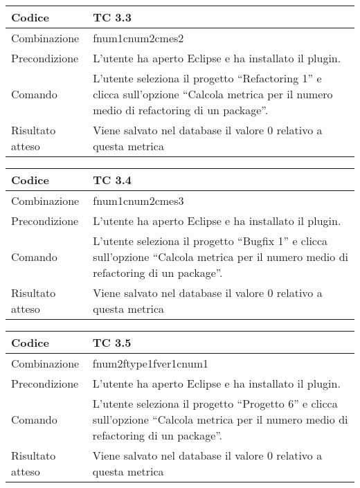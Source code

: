 \begin{table}[ht]
\begin{tabular}{|p{3cm}|p{9cm}|}
\hline
\cellcolor{lightgray}Codice				& TC 3.3								\\
\hline
\cellcolor{lightgray}Combinazione		& fnum1cnum2cmes2									\\
\hline
\cellcolor{lightgray}Precondizione		& L'utente ha aperto Eclipse e ha installato il plugin.					\\
\hline
\cellcolor{lightgray}Comando			& L'utente seleziona il progetto ``Refactoring 1''  e clicca sull'opzione ``Calcola metrica per il numero medio di refactoring di un package''.	\\
\hline
\cellcolor{lightgray}Risultato atteso	& Viene salvato nel database il valore 0 relativo a questa metrica	\\
\hline
\end{tabular}
\end{table}

\begin{table}[ht]
\begin{tabular}{|p{3cm}|p{9cm}|}
\hline
\cellcolor{lightgray}Codice				& TC 3.4								\\
\hline
\cellcolor{lightgray}Combinazione		& fnum1cnum2cmes3									\\
\hline
\cellcolor{lightgray}Precondizione		& L'utente ha aperto Eclipse e ha installato il plugin.			\\
\hline
\cellcolor{lightgray}Comando			& L'utente seleziona il progetto ``Bugfix 1''  e clicca sull'opzione ``Calcola metrica per il numero medio di refactoring di un package''.	\\
\hline
\cellcolor{lightgray}Risultato atteso	& Viene salvato nel database il valore 0 relativo a questa metrica	\\
\hline
\end{tabular}
\end{table}

\begin{table}[ht]
\begin{tabular}{|p{3cm}|p{9cm}|}
\hline
\cellcolor{lightgray}Codice				& TC 3.5								\\
\hline
\cellcolor{lightgray}Combinazione		& fnum2ftype1fver1cnum1 									\\
\hline
\cellcolor{lightgray}Precondizione		& L'utente ha aperto Eclipse e ha installato il plugin.			\\
\hline
\cellcolor{lightgray}Comando			& L'utente seleziona il progetto ``Progetto 6''  e clicca sull'opzione ``Calcola metrica per il numero medio di refactoring di un package''.	\\
\hline
\cellcolor{lightgray}Risultato atteso	& Viene salvato nel database il valore 0 relativo a questa metrica	\\
\hline
\end{tabular}
\end{table}

